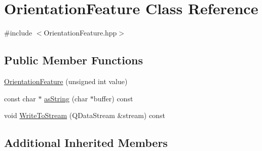 \hypertarget{class_orientation_feature}{\section{Orientation\+Feature Class Reference}
\label{class_orientation_feature}
}


{\ttfamily \#include $<$Orientation\+Feature.\+hpp$>$}

\subsection*{Public Member Functions}
\begin{DoxyCompactItemize}
\item 
\hyperlink{class_orientation_feature_a314e2759927f7c3c625e298ab1f7e244}{Orientation\+Feature} (unsigned int value)
\item 
const char $\ast$ \hyperlink{class_orientation_feature_a181ee73c51e33108e21a52c6b95e81e7}{as\+String} (char $\ast$buffer) const 
\item 
void \hyperlink{class_orientation_feature_a6d8d3934b981be06db8d7191c6ffdbf1}{Write\+To\+Stream} (Q\+Data\+Stream \&stream) const 
\end{DoxyCompactItemize}
\subsection*{Additional Inherited Members}


